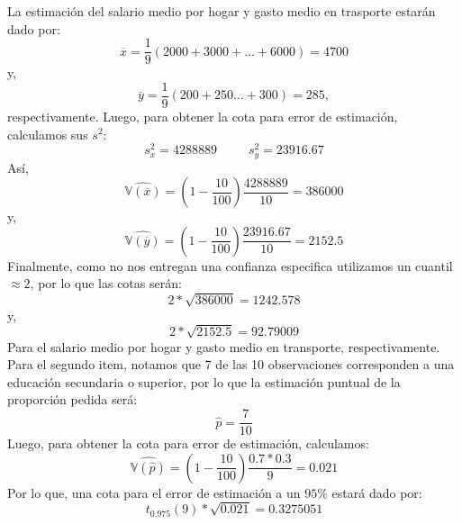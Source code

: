 \begin{solution}
La estimación del salario medio por hogar y gasto medio en trasporte estarán dado por:
$$\overline{x}=\dfrac{1}{9}\left(2000+3000+\dots+6000\right)=4700$$
y,
$$\overline{y}=\dfrac{1}{9}\left(200+250\dots+300\right)=285,$$
respectivamente.
Luego, para obtener la cota para error de estimación, calculamos sus $s^2$:
$$s_{x}^{2}=4288889 \hspace{30pt} s_{y}^{2}=23916.67$$
Así, 
$$\widehat{\mathbb{V}(\overline{x})}=\left(1-\dfrac{10}{100}\right)\dfrac{4288889}{10}=386000$$
y,
$$\widehat{\mathbb{V}(\overline{y})}=\left(1-\dfrac{10}{100}\right)\dfrac{23916.67}{10}=2152.5$$
Finalmente, como no nos entregan una confianza especifica utilizamos un cuantil $\approx 2$, por lo que las cotas serán:
$$2*\sqrt{386000}=1242.578$$
y,
$$2*\sqrt{2152.5}=92.79009$$
Para el salario medio por hogar y gasto medio en transporte, respectivamente.\\

Para el segundo item, notamos que 7 de las 10 observaciones corresponden a una educación secundaria o superior, por lo que la estimación puntual de la proporción pedida será:
$$\hat{p}=\dfrac{7}{10}$$
Luego, para obtener la cota para error de estimación, calculamos: 
$$\widehat{\mathbb{V}(\hat{p})}=\left(1-\dfrac{10}{100}\right)\dfrac{0.7*0.3}{9}=0.021$$
Por lo que, una cota para el error de estimación a un $95\%$ estará dado por:
$$t_{0.975}(9)*\sqrt{0.021}=0.3275051$$
\end{solution}